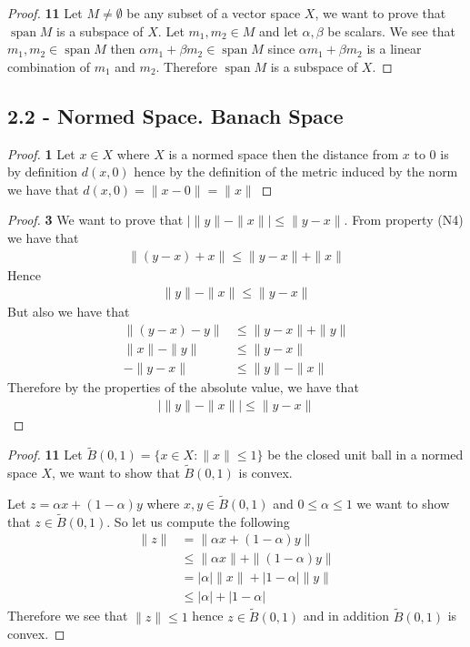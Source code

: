 \documentclass[11pt]{article}
\theoremstyle{definition}
\begin{document}
\begin{proof}{\textbf{11}}
    Let $M \neq \emptyset$ be any subset of a vector space $X$,
    we want to prove that $\operatorname{span} M$ is a subspace of $X$.
    Let $m_1, m_2 \in M$ and let $\alpha, \beta$ be scalars.
    We see that $m_1, m_2 \in \operatorname{span} M$
    then $\alpha m_1 + \beta m_2 \in \operatorname{span} M$ since
    $\alpha m_1 + \beta m_2$ is a linear combination of $m_1$ and $m_2$.
    Therefore $\operatorname{span} M$ is a subspace of $X$.
\end{proof}
\subsection*{2.2 - Normed Space. Banach Space}
\begin{proof}{\textbf{1}}
    Let $x \in X$ where $X$ is a normed space then
    the distance from $x$ to $0$ is by definition $d(x, 0)$ hence by the
    definition of the metric induced by the norm we have that
    $d(x, 0) = \|x - 0\| = \|x\|$
\end{proof}
\begin{proof}{\textbf{3}}
    We want to prove that $|\|y\| - \|x\|| \leq \|y - x\|$. From property (N4)
    we have that
    \begin{align*}
        \|(y -x) + x\| \leq \|y - x\| + \|x\|
    \end{align*}
    Hence
    \begin{align*}
        \|y\| -\|x\| \leq \|y - x\|
    \end{align*}
    But also we have that
    \begin{align*}
        \|(y - x) - y\| &\leq \|y - x\| + \|y\|\\
        \|x\| - \|y\|  &\leq  \|y - x\|\\
        -\|y - x\| &\leq \|y\| - \|x\|
    \end{align*}
    Therefore by the properties of the absolute value, we have that
    \begin{align*}
        |\|y\| - \|x\|| \leq \|y - x\|
    \end{align*}
\end{proof}
\cleardoublepage
\begin{proof}{\textbf{11}}
    Let $\tilde B(0,1) = \{x \in X: \|x\| \leq 1\}$ be the closed unit ball in
    a normed space $X$, we want to show that $\tilde B(0,1)$ is convex.

    Let $z = \alpha x + (1-\alpha)y$ where $x,y \in \tilde B(0,1)$ and
    $0 \leq \alpha \leq 1$ we want to show that $z \in \tilde B(0,1)$.
    So let us compute the following
    \begin{align*}
        \|z\| &= \|\alpha x + (1-\alpha)y\|\\
            &\leq \|\alpha x\| + \|(1-\alpha)y\|\\
            &= |\alpha|\| x\| + |1 - \alpha|\|y\|\\
            &\leq |\alpha| + |1 - \alpha|
    \end{align*}
    Therefore we see that $\|z\| \leq 1$ hence $z \in \tilde B(0,1)$ and
    in addition $\tilde B(0,1)$ is convex.
\end{proof}
\end{document}
